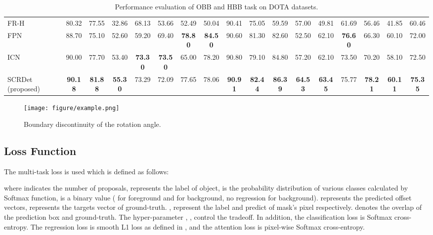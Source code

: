 \documentclass[10pt,twocolumn,letterpaper]{article}
\begin{document}
\begin{table*}
{\begin{tabular}{|l|c|c|c|c|c|c|c|c|c|c|c|c|c|c|c|c|}
				FR-H \cite{ren2017faster} & 80.32 & 77.55 & 32.86 & 68.13 & 53.66 & 52.49 & 50.04 & 90.41 & 75.05 & 59.59 & 57.00 & 49.81 & 61.69 & 56.46 & 41.85 & 60.46 \\
				FPN \cite{lin2017feature} & 88.70 & 75.10 & 52.60 & 59.20 & 69.40 & {\bf 78.80} & {\bf 84.50} & 90.60 & 81.30 & 82.60 & 52.50 & 62.10 & {\bf 76.60} & 66.30 & 60.10 & 72.00 \\
				ICN \cite{azimi2018towards} & 90.00 & 77.70 & 53.40 & {\bf 73.30} & {\bf 73.50} & 65.00 & 78.20 & 90.80 & 79.10 & 84.80 & 57.20 & 62.10 & 73.50 & 70.20 & 58.10 & 72.50 \\
				SCRDet (proposed) & {\bf 90.18} & {\bf 81.88} & {\bf 55.30} & 73.29 & 72.09 & 77.65 & 78.06 & {\bf 90.91} & {\bf 82.44} & {\bf 86.39} & {\bf 64.53} & {\bf 63.45} & 75.77 & {\bf 78.21} & {\bf 60.11} & {\bf 75.35} \\
				\bottomrule
		\end{tabular}}
		\vspace{-10pt}	
		\caption{Performance evaluation of OBB and HBB task on DOTA datasets.}
		\label{table:OBB_HBB}
	\end{table*}
	
	\begin{figure}[!tb]
		\begin{center}
\texttt{[image: figure/example.png]}
			\vspace{-10pt}
			\caption{Boundary discontinuity of the rotation angle.}
			\label{fig:example}
		\end{center}
	\end{figure}
	
	\subsection{Loss Function}
	The multi-task loss is used which is defined as follows:
	
	where  indicates the number of proposals,  represents the label of object,  is the probability distribution of various classes calculated by Softmax function,  is a binary value ( for foreground and  for background, no regression for background).  represents the predicted offset vectors,  represents the targets vector of ground-truth. ,  represent the label and predict of mask's pixel respectively.  denotes the overlap of the prediction box and ground-truth. The hyper-parameter , ,   control the tradeoff. In addition, the classification loss  is Softmax cross-entropy. The regression loss  is smooth L1 loss as defined in \cite{girshick2015fast}, and the attention loss  is pixel-wise Softmax cross-entropy.
	
\end{document}
